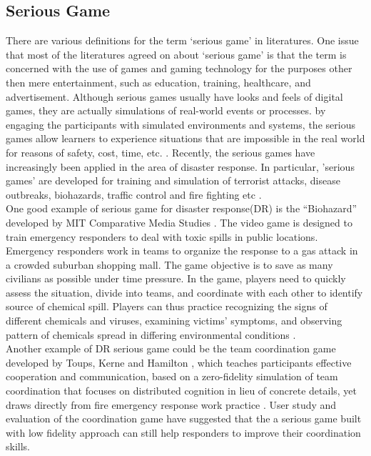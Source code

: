 \subsection{Serious Game}
There are various definitions for the term `serious game' in literatures. One issue that most of the literatures agreed on about `serious game' is that the term is concerned with the use of games and gaming technology for the purposes other then mere entertainment, such as education, training, healthcare, and advertisement.\cite{Susi2007} Although serious games usually have looks and feels of digital games, they are actually simulations of real-world events or processes. by engaging the participants with simulated environments and systems, the serious games allow learners to experience situations that are impossible in the real world for reasons of safety, cost, time, etc. \cite{Squire2003,Meesters2013}. Recently, the serious games have increasingly been applied in the area of disaster response. In particular, 'serious games' are developed for training and simulation of terrorist attacks, disease outbreaks, biohazards, traffic control and fire fighting etc \cite{Susi2007,Squire2003}. \\

One good example of serious game for disaster response(DR) is the ``Biohazard'' developed by MIT Comparative Media Studies \cite{Squire2003}. The video game is designed to train emergency responders to deal with toxic spills in public locations. Emergency responders work in teams to organize the response to a gas attack in a crowded suburban shopping mall. The game objective is to save as many civilians as possible under time pressure. In the game,  players need to quickly assess the situation, divide into teams, and coordinate with each other to identify source of chemical spill. Players can thus practice recognizing the signs of different chemicals and viruses, examining victims' symptoms, and observing pattern of chemicals spread in differing environmental conditions \cite{Susi2007}.\\


Another example of \ac{DR} serious game could be the team coordination game developed by Toups, Kerne and Hamilton \cite{Toups2011}, which teaches participants effective cooperation and communication, based on a zero-fidelity simulation of team coordination that focuses on distributed cognition in lieu of concrete details, yet draws directly from fire emergency response work practice \cite{Toups2011}. User study and evaluation of the coordination game have suggested that the a serious game built with low fidelity approach can still help responders to improve their coordination skills.\\

